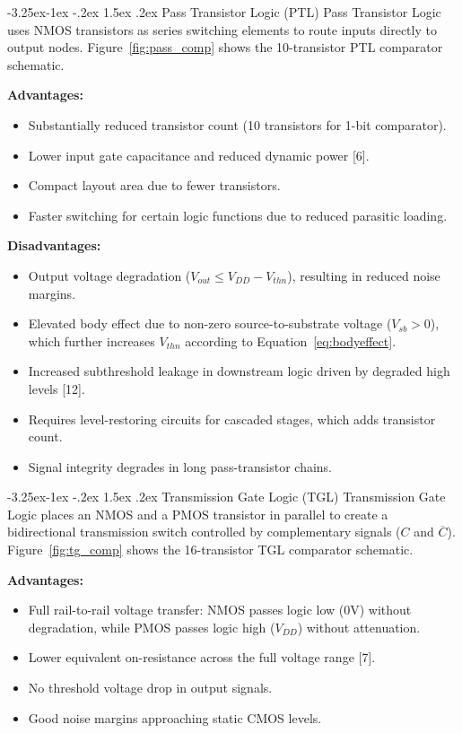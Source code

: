 \documentclass[12pt,a4paper,oneside]{report}
\makeatletter
\renewcommand\subsection{\@startsection{subsection}{2}{\z@}%
                                     {-3.25ex\@plus -1ex \@minus -.2ex}%
                                     {1.5ex \@plus .2ex}%
                                     {\normalfont\normalsize\bfseries\itshape}}
\makeatother
\begin{document}
\subsection{Pass Transistor Logic (PTL)}
Pass Transistor Logic uses NMOS transistors as series switching elements to route inputs directly to output nodes. Figure~\ref{fig:pass_comp} shows the 10-transistor PTL comparator schematic.

\noindent\textbf{Advantages:}
\begin{itemize}
\item Substantially reduced transistor count (10 transistors for 1-bit comparator).
\item Lower input gate capacitance and reduced dynamic power [6].
\item Compact layout area due to fewer transistors.
\item Faster switching for certain logic functions due to reduced parasitic loading.
\end{itemize}

\noindent\textbf{Disadvantages:}
\begin{itemize}
\item Output voltage degradation ($V_{out} \le V_{DD} - V_{thn}$), resulting in reduced noise margins.
\item Elevated body effect due to non-zero source-to-substrate voltage ($V_{sb} > 0$), which further increases $V_{thn}$ according to Equation~\ref{eq:bodyeffect}.
\item Increased subthreshold leakage in downstream logic driven by degraded high levels [12].
\item Requires level-restoring circuits for cascaded stages, which adds transistor count.
\item Signal integrity degrades in long pass-transistor chains.
\end{itemize}

\subsection{Transmission Gate Logic (TGL)}
Transmission Gate Logic places an NMOS and a PMOS transistor in parallel to create a bidirectional transmission switch controlled by complementary signals ($C$ and $\overline{C}$). Figure~\ref{fig:tg_comp} shows the 16-transistor TGL comparator schematic.

\noindent\textbf{Advantages:}
\begin{itemize}
\item Full rail-to-rail voltage transfer: NMOS passes logic low ($0\text{V}$) without degradation, while PMOS passes logic high ($V_{DD}$) without attenuation.
\item Lower equivalent on-resistance across the full voltage range [7].
\item No threshold voltage drop in output signals.
\item Good noise margins approaching static CMOS levels.
\end{itemize}
\end{document}
